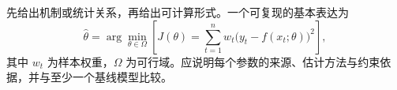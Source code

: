 先给出机制或统计关系，再给出可计算形式。一个可复现的基本表达为
\begin{equation}
  \hat{\theta}=\arg\min_{\theta\in\Omega}
  \left[J(\theta)=\sum_{t=1}^{n}w_t\bigl(y_t-f(x_t;\theta)\bigr)^2\right],
  \label{eq:objective}
\end{equation}
其中 $w_t$ 为样本权重，$\Omega$ 为可行域。应说明每个参数的来源、估计方法与约束依据，并与至少一个基线模型比较。
